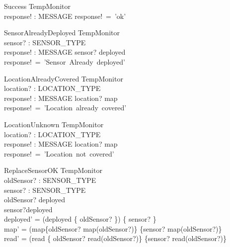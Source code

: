 \documentclass[12pt]{article}
\begin{document}
		
	
		\begin{schema}{Success}
			\Xi TempMonitor\\
			response! : MESSAGE
			\where
			response!~=~'ok'\\
		\end{schema}
		
		
		
		\begin{schema}{SensorAlreadyDeployed}
			\Xi TempMonitor\\
			sensor? : SENSOR\_TYPE\\
			response! : MESSAGE
			\where
			sensor? \in deployed\\
			response!~=~'Sensor~Already~deployed'\\
		\end{schema}
		
		
		
		\begin{schema}{LocationAlreadyCovered}
			\Xi TempMonitor\\
			location? : LOCATION\_TYPE\\
			response! : MESSAGE
			\where
			location? \in \ran map\\
			response!~=~'Location~already~covered'
		\end{schema}
		
		
		
		\begin{schema}{LocationUnknown}
			\Xi TempMonitor\\
			location? : LOCATION\_TYPE\\
			response! : MESSAGE
			\where
			location? \notin \ran map\\
			response!~=~'Location~not~covered'
		\end{schema}
		
		
		\begin{schema}{ReplaceSensorOK}
			\Delta TempMonitor\\
			oldSensor? : SENSOR\_TYPE\\
			sensor? : SENSOR\_TYPE\\
			\where
			oldSensor? \in deployed\\
			sensor?\notin deployed\\
			deployed' = (deployed \setminus \{ oldSensor? \}) \cup \{ sensor? \} \\
  			map' = (map\setminus\{oldSensor? \mapsto map(oldSensor?)\} \cup \{sensor? \mapsto map(oldSensor?)\} \\
 		    	read' = (read \setminus \{ oldSensor? \mapsto read(oldSensor?)\} \cup \{sensor? \mapsto read(oldSensor?)\} \\
		\end{schema}
\end{document}
